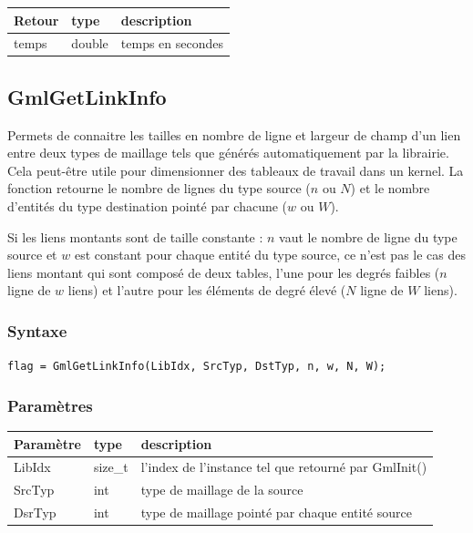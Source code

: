 \documentclass[a4paper,12pt]{article}
\begin{document}
\medskip

\begin{tabular}{|m{2cm}|m{1.5cm}|m{10.5cm}|}
\hline
Retour     & type    & description \\
\hline
temps      & double  & temps en secondes \\
\hline
\end{tabular}


\subsection{GmlGetLinkInfo}

Permets de connaitre les tailles en nombre de ligne et largeur de champ d'un lien entre deux types de maillage tels que générés automatiquement par la librairie. Cela peut-être utile pour dimensionner des tableaux de travail dans un kernel.
La fonction retourne le nombre de lignes du type source ($n$ ou $N$) et le nombre d'entités du type destination pointé par chacune ($w$ ou $W$).

Si les liens montants sont de taille constante : $n$ vaut le nombre de ligne du type source et $w$ est constant pour chaque entité du type source, ce n'est pas le cas des liens montant qui sont composé de deux tables, l'une pour les degrés faibles ($n$ ligne de $w$ liens) et l'autre pour les éléments de degré élevé ($N$ ligne de $W$ liens).

\subsubsection*{Syntaxe}

{\tt flag = GmlGetLinkInfo(LibIdx, SrcTyp, DstTyp, n, w, N, W);}

\subsubsection*{Paramètres}

\begin{tabular}{|m{2cm}|m{1.5cm}|m{10.5cm}|}
\hline
Paramètre  & type    & description \\
\hline
LibIdx     & size\_t & l'index de l'instance tel que retourné par GmlInit() \\
\hline
SrcTyp     & int     &  type de maillage de la source \\
\hline
DsrTyp     & int     &  type de maillage pointé par chaque entité source \\
\hline
\end{tabular}
\end{document}
